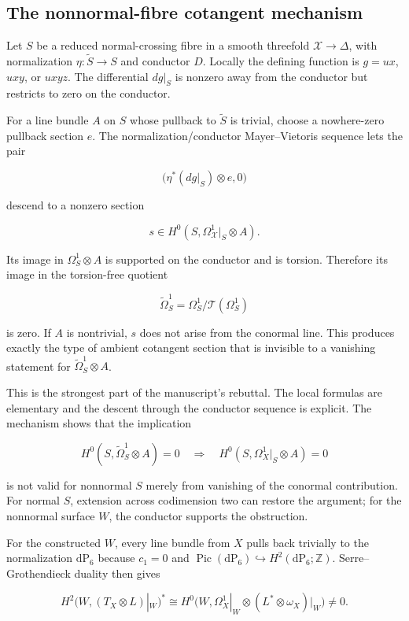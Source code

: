 \documentclass[
  10pt,
  letterpaper,
]{article}
\newcommand{\Z}{\mathbb Z}
\newcommand{\Pic}{\operatorname{Pic}}
\newcommand{\dP}{\mathrm{dP}}
\begin{document}
\subsection{The nonnormal-fibre cotangent
mechanism}\label{the-nonnormal-fibre-cotangent-mechanism}

Let \(S\) be a reduced normal-crossing fibre in a smooth threefold
\(\mathcal X\to\Delta\), with normalization \(\eta:\widetilde S\to S\)
and conductor \(D\). Locally the defining function is \(g=ux\), \(uxy\),
or \(uxyz\). The differential \(dg|_S\) is nonzero away from the
conductor but restricts to zero on the conductor.

For a line bundle \(A\) on \(S\) whose pullback to \(\widetilde S\) is
trivial, choose a nowhere-zero pullback section \(e\). The
normalization/conductor Mayer--Vietoris sequence lets the pair

\[
\bigl(\eta^*(dg|_S)\otimes e,0\bigr)
\]

descend to a nonzero section

\[
s\in H^0(S,\Omega^1_{\mathcal X}|_S\otimes A).
\]

Its image in \(\Omega_S^1\otimes A\) is supported on the conductor and
is torsion. Therefore its image in the torsion-free quotient

\[
\widetilde\Omega_S^1=\Omega_S^1/\mathcal T(\Omega_S^1)
\]

is zero. If \(A\) is nontrivial, \(s\) does not arise from the conormal
line. This produces exactly the type of ambient cotangent section that
is invisible to a vanishing statement for
\(\widetilde\Omega_S^1\otimes A\).

This is the strongest part of the manuscript's rebuttal. The local
formulas are elementary and the descent through the conductor sequence
is explicit. The mechanism shows that the implication

\[
H^0(S,\widetilde\Omega_S^1\otimes A)=0
\quad\Longrightarrow\quad
H^0(S,\Omega^1_X|_S\otimes A)=0
\]

is not valid for nonnormal \(S\) merely from vanishing of the conormal
contribution. For normal \(S\), extension across codimension two can
restore the argument; for the nonnormal surface \(W\), the conductor
supports the obstruction.

For the constructed \(W\), every line bundle from \(X\) pulls back
trivially to the normalization \(\dP_6\) because \(c_1=0\) and
\(\Pic(\dP_6)\hookrightarrow H^2(\dP_6;\Z)\). Serre--Grothendieck
duality then gives

\[
H^2\bigl(W,(T_X\otimes L)|_W\bigr)^*
\cong
H^0\bigl(W,\Omega_X^1|_W\otimes(L^*\otimes\omega_X)|_W\bigr)
\ne0.
\]
\end{document}
